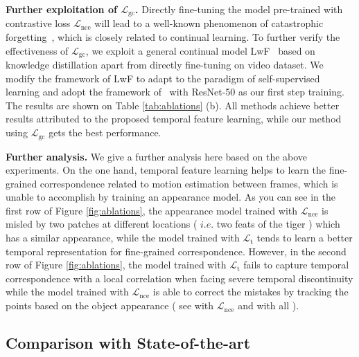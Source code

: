 \documentclass{article}
\begin{document}
\textbf{Further exploitation of $\mathcal{L}_{\mathrm{gc}}$.}  Directly fine-tuning the model pre-trained with contrastive loss $\mathcal{L}_{\mathrm{nce}}$ will lead to a well-known phenomenon of catastrophic forgetting~\cite{li2017learning}, which is closely related to continual learning. To further verify the effectiveness of  $\mathcal{L}_{\mathrm{gc}}$, we exploit a general continual model LwF~\cite{li2017learning}  based on knowledge distillation apart from directly fine-tuning on video dataset. We modify the framework of LwF to adapt to the paradigm of self-supervised learning and adopt the framework of~\cite{xie2021detco} with ResNet-50 as our first step training. The results are shown on Table \ref{tab:ablations} (b). All methods achieve better results attributed to the proposed temporal feature learning, while our method using $\mathcal{L}_{\mathrm{gc}}$ gets the best performance. 

\textbf{Further analysis.} 
We give a further analysis here based on the above experiments. On the one hand, temporal feature learning helps to learn the fine-grained correspondence related to motion estimation between frames, which is unable to accomplish by training an appearance model. As you can see in the first row of Figure \ref{fig:ablations}, the appearance model trained with $\mathcal{L}_{\mathrm{nce}}$ is misled by two patches at different locations ( $i.e.$ two feats of the tiger ) which has a similar appearance, while the model trained with $\mathcal{L}_{\mathrm{t}}$ tends to learn a better temporal representation for fine-grained correspondence. However, in the second row of Figure \ref{fig:ablations}, the model trained with $\mathcal{L}_{\mathrm{t}}$ fails to capture temporal correspondence with a local correlation when facing severe temporal discontinuity while the model trained with $\mathcal{L}_{\mathrm{nce}}$ is able to correct the mistakes by tracking the points based on the object appearance ( see with $\mathcal{L}_{\mathrm{nce}}$ and with all ).

\subsection{Comparison with State-of-the-art}
\end{document}
